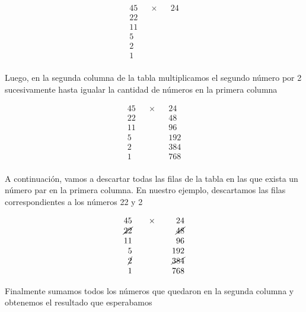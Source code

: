 \documentclass[12pt]{article}
\theoremstyle{definition}
\begin{document}
\[
\begin{array}{rcccr}
45 &  & \times &  & 24 \\
22 &  &        &  &  \\
11 &  &        &  &  \\
5 &  &        &  &  \\
2 &  &        &  &  \\
1 &  &        &  &  \\
\end{array}
\]

Luego, en la segunda columna de la tabla multiplicamos el segundo n\'umero por 2 sucesivamente hasta igualar la cantidad de n\'umeros en la primera columna

\[
\begin{array}{rcccr}
45 &  & \times &  & 24 \\
22 &  &        &  & 48 \\
11 &  &        &  & 96 \\
5 &  &        &  & 192 \\
2 &  &        &  & 384 \\
1 &  &        &  & 768 \\
\end{array}
\]

A continuaci\'on, vamos a descartar todas las filas de la tabla en las que exista un n\'umero par en la primera columna. En nuestro ejemplo, descartamos las filas correspondientes a los n\'umeros 22 y 2

\[
\begin{array}{rcccr}
45 &  & \times &  & 24 \\
\cancel{22} &  &        &  & \cancel{48}\\
11 &  &        &  & 96 \\
 5 &  &        &  & 192 \\
 \cancel{2} &  &        &  & \cancel{384} \\
 1 &  &        &  & 768 \\
\end{array}
\]

Finalmente sumamos todos los n\'umeros que quedaron en la segunda columna y obtenemos el resultado que esperabamos

\setlength{\arrayrulewidth}{.08em}
\end{document}
